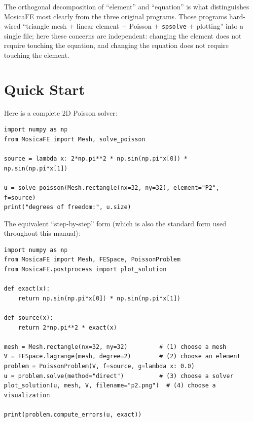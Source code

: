 \documentclass[11pt,oneside]{book}
\theoremstyle{definition}
\theoremstyle{plain}
\newenvironment{important}{%
  \begin{tcolorbox}[colback=blue!5,colframe=blue!45,title=Key Point,fonttitle=\bfseries]%
}{%
  \end{tcolorbox}%
}
\newcommand{\mosica}{\textsf{MosicaFE}}
\newcommand{\code}[1]{\texttt{#1}}
\begin{document}
\begin{important}
The orthogonal decomposition of ``element'' and ``equation'' is what distinguishes
\mosica{} most clearly from the three original programs. Those programs hard-wired
``triangle mesh $+$ linear element $+$ Poisson $+$ \code{spsolve} $+$ plotting''
into a single file; here these concerns are independent: changing the element does
not require touching the equation, and changing the equation does not require
touching the element.
\end{important}

\section{Quick Start}

Here is a complete 2D Poisson solver:

\begin{lstlisting}[language=MosicaFE,caption={Solving the Poisson equation in two lines},label={lst:quickstart}]
import numpy as np
from MosicaFE import Mesh, solve_poisson

source = lambda x: 2*np.pi**2 * np.sin(np.pi*x[0]) * np.sin(np.pi*x[1])

u = solve_poisson(Mesh.rectangle(nx=32, ny=32), element="P2", f=source)
print("degrees of freedom:", u.size)
\end{lstlisting}

The equivalent ``step-by-step'' form (which is also the standard form used
throughout this manual):

\begin{lstlisting}[language=MosicaFE,caption={Choosing mesh / element / solver / visualization},label={lst:quicksplit}]
import numpy as np
from MosicaFE import Mesh, FESpace, PoissonProblem
from MosicaFE.postprocess import plot_solution

def exact(x):
    return np.sin(np.pi*x[0]) * np.sin(np.pi*x[1])

def source(x):
    return 2*np.pi**2 * exact(x)

mesh = Mesh.rectangle(nx=32, ny=32)         # (1) choose a mesh
V = FESpace.lagrange(mesh, degree=2)        # (2) choose an element
problem = PoissonProblem(V, f=source, g=lambda x: 0.0)
u = problem.solve(method="direct")          # (3) choose a solver
plot_solution(u, mesh, V, filename="p2.png")  # (4) choose a visualization

print(problem.compute_errors(u, exact))
\end{lstlisting}
\end{document}
